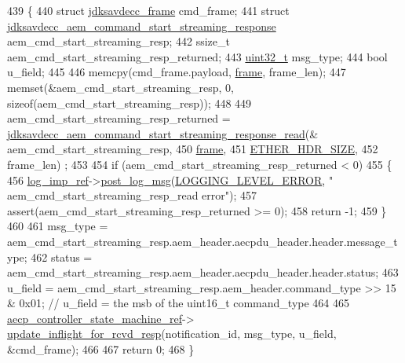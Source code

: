 \begin{DoxyCode}
439 \{
440     \textcolor{keyword}{struct }\hyperlink{structjdksavdecc__frame}{jdksavdecc\_frame} cmd\_frame;
441     \textcolor{keyword}{struct }\hyperlink{structjdksavdecc__aem__command__start__streaming__response}{jdksavdecc\_aem\_command\_start\_streaming\_response} 
      aem\_cmd\_start\_streaming\_resp;
442     ssize\_t aem\_cmd\_start\_streaming\_resp\_returned;
443     \hyperlink{parse_8c_a6eb1e68cc391dd753bc8ce896dbb8315}{uint32\_t} msg\_type;
444     \textcolor{keywordtype}{bool} u\_field;
445 
446     memcpy(cmd\_frame.payload, \hyperlink{gst__avb__playbin_8c_ac8e710e0b5e994c0545d75d69868c6f0}{frame}, frame\_len);
447     memset(&aem\_cmd\_start\_streaming\_resp, 0, \textcolor{keyword}{sizeof}(aem\_cmd\_start\_streaming\_resp));
448 
449     aem\_cmd\_start\_streaming\_resp\_returned = 
      \hyperlink{group__command__start__streaming__response_ga7aaa67f690314dc70f6972a98f5e23f7}{jdksavdecc\_aem\_command\_start\_streaming\_response\_read}(&
      aem\_cmd\_start\_streaming\_resp,
450                                                                                                  
      \hyperlink{gst__avb__playbin_8c_ac8e710e0b5e994c0545d75d69868c6f0}{frame},
451                                                                                                  
      \hyperlink{namespaceavdecc__lib_a6c827b1a0d973e18119c5e3da518e65ca9512ad9b34302ba7048d88197e0a2dc0}{ETHER\_HDR\_SIZE},
452                                                                                                  frame\_len)
      ;
453 
454     \textcolor{keywordflow}{if} (aem\_cmd\_start\_streaming\_resp\_returned < 0)
455     \{
456         \hyperlink{namespaceavdecc__lib_acbe3e2a96ae6524943ca532c87a28529}{log\_imp\_ref}->\hyperlink{classavdecc__lib_1_1log_a68139a6297697e4ccebf36ccfd02e44a}{post\_log\_msg}(\hyperlink{namespaceavdecc__lib_a501055c431e6872ef46f252ad13f85cdaf2c4481208273451a6f5c7bb9770ec8a}{LOGGING\_LEVEL\_ERROR}, \textcolor{stringliteral}{"
      aem\_cmd\_start\_streaming\_resp\_read error"});
457         assert(aem\_cmd\_start\_streaming\_resp\_returned >= 0);
458         \textcolor{keywordflow}{return} -1;
459     \}
460 
461     msg\_type = aem\_cmd\_start\_streaming\_resp.aem\_header.aecpdu\_header.header.message\_type;
462     status = aem\_cmd\_start\_streaming\_resp.aem\_header.aecpdu\_header.header.status;
463     u\_field = aem\_cmd\_start\_streaming\_resp.aem\_header.command\_type >> 15 & 0x01; \textcolor{comment}{// u\_field = the msb of
       the uint16\_t command\_type}
464 
465     \hyperlink{namespaceavdecc__lib_a0b1b5aea3c0490f77cbfd9178af5be22}{aecp\_controller\_state\_machine\_ref}->
      \hyperlink{classavdecc__lib_1_1aecp__controller__state__machine_a997abd9786c330a5505e903e6443208e}{update\_inflight\_for\_rcvd\_resp}(notification\_id, msg\_type, u\_field, &cmd\_frame);
466 
467     \textcolor{keywordflow}{return} 0;
468 \}
\end{DoxyCode}


